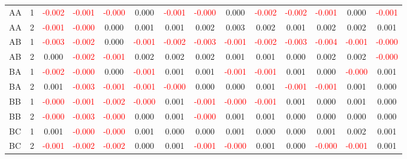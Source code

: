 \begin{table}[!htb]
{\begin{tabular}{llcccccccccccc}
AA & 1 & \textcolor{red}{-0.002} & \textcolor{red}{-0.001} & \textcolor{red}{-0.000} & 0.000 & \textcolor{red}{-0.001} & \textcolor{red}{-0.000} & 0.000 & \textcolor{red}{-0.002} & \textcolor{red}{-0.002} & \textcolor{red}{-0.001} & 0.000 & \textcolor{red}{-0.001}\\
AA & 2 & \textcolor{red}{-0.001} & \textcolor{red}{-0.000} & 0.000 & 0.001 & 0.001 & 0.002 & 0.003 & 0.002 & 0.001 & 0.002 & 0.002 & 0.001\\
AB & 1 & \textcolor{red}{-0.003} & \textcolor{red}{-0.002} & 0.000 & \textcolor{red}{-0.001} & \textcolor{red}{-0.002} & \textcolor{red}{-0.003} & \textcolor{red}{-0.001} & \textcolor{red}{-0.002} & \textcolor{red}{-0.003} & \textcolor{red}{-0.004} & \textcolor{red}{-0.001} & \textcolor{red}{-0.000}\\
AB & 2 & 0.000 & \textcolor{red}{-0.002} & \textcolor{red}{-0.001} & 0.002 & 0.002 & 0.002 & 0.001 & 0.001 & 0.000 & 0.002 & 0.002 & \textcolor{red}{-0.000}\\
BA & 1 & \textcolor{red}{-0.002} & \textcolor{red}{-0.000} & 0.000 & \textcolor{red}{-0.001} & 0.001 & 0.001 & \textcolor{red}{-0.001} & \textcolor{red}{-0.001} & 0.001 & 0.000 & \textcolor{red}{-0.000} & 0.001\\
BA & 2 & 0.001 & \textcolor{red}{-0.003} & \textcolor{red}{-0.001} & \textcolor{red}{-0.001} & \textcolor{red}{-0.000} & 0.000 & 0.000 & 0.001 & \textcolor{red}{-0.001} & \textcolor{red}{-0.001} & 0.001 & 0.000\\
BB & 1 & \textcolor{red}{-0.000} & \textcolor{red}{-0.001} & \textcolor{red}{-0.002} & \textcolor{red}{-0.000} & 0.001 & \textcolor{red}{-0.001} & \textcolor{red}{-0.000} & \textcolor{red}{-0.001} & 0.001 & 0.000 & 0.001 & 0.000\\
BB & 2 & \textcolor{red}{-0.000} & \textcolor{red}{-0.003} & \textcolor{red}{-0.000} & 0.000 & 0.001 & \textcolor{red}{-0.000} & 0.001 & 0.001 & 0.000 & 0.000 & 0.000 & 0.000\\
BC & 1 & 0.001 & \textcolor{red}{-0.000} & \textcolor{red}{-0.000} & 0.001 & 0.000 & 0.000 & 0.001 & 0.000 & 0.000 & 0.001 & 0.002 & 0.001\\
BC & 2 & \textcolor{red}{-0.001} & \textcolor{red}{-0.002} & \textcolor{red}{-0.002} & 0.000 & 0.001 & \textcolor{red}{-0.001} & \textcolor{red}{-0.000} & 0.001 & 0.000 & \textcolor{red}{-0.000} & \textcolor{red}{-0.001} & 0.001\\
\hline
    \end{tabular}%
    }
\end{table}


